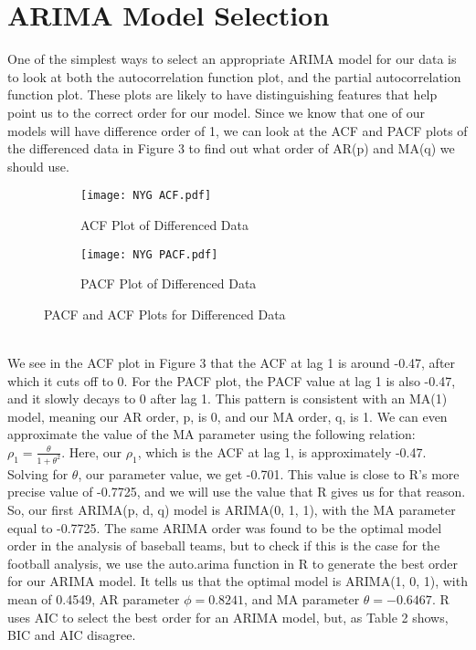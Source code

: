 \documentclass[12pt]{article}
\begin{document}
\section{ARIMA Model Selection}\label{sec:chapter}
One of the simplest ways to select an appropriate ARIMA model for our data is to look at both the autocorrelation function plot, and the partial autocorrelation function plot. These plots are likely to have distinguishing features that help point us to the correct order for our model. Since we know that one of our models will have difference order of 1, we can look at the ACF and PACF plots of the differenced data in Figure 3 to find out what order of AR(p) and MA(q) we should use. \\
\begin{figure}[h]
\begin{subfigure}{0.5\textwidth}
\texttt{[image: NYG ACF.pdf]} 
\caption{ACF Plot of Differenced Data}
\label{fig:subim1}
\end{subfigure}
\begin{subfigure}{0.5\textwidth}
\texttt{[image: NYG PACF.pdf]}
\caption{PACF Plot of Differenced Data}
\label{fig:subim2}
\end{subfigure}
\caption{PACF and ACF Plots for Differenced Data}
\label{fig:Figure 3}
\end{figure}\\
We see in the ACF plot in Figure 3 that the ACF at lag 1 is around -0.47, after which it cuts off to 0. For the PACF plot, the PACF value at lag 1 is also -0.47, and it slowly decays to 0 after lag 1. This pattern is consistent with an MA(1) model, meaning our AR order, p, is 0, and our MA order, q, is 1. We can even approximate the value of the MA parameter using the following relation: \(\rho_1 = \frac{\theta}{1 + \theta^2}\). Here, our \(\rho_1\), which is the ACF at lag 1, is approximately -0.47. Solving for \(\theta\), our parameter value, we get -0.701. This value is close to R's more precise value of -0.7725, and we will use the value that R gives us for that reason. So, our first ARIMA(p, d, q) model is ARIMA(0, 1, 1), with the MA parameter equal to -0.7725. The same ARIMA order was found to be the optimal model order in the analysis of baseball teams, but to check if this is the case for the football analysis, we use the auto.arima function in R to generate the best order for our ARIMA model. It tells us that the optimal model is ARIMA(1, 0, 1), with mean of 0.4549, AR parameter \(\phi = 0.8241\), and MA parameter \(\theta = -0.6467\). R uses AIC to select the best order for an ARIMA model, but, as Table 2 shows, BIC and AIC disagree.\\
\end{document}
